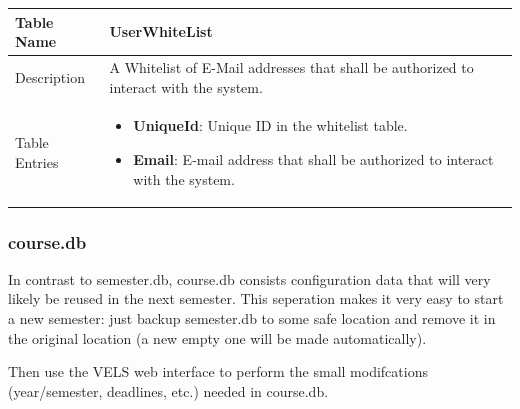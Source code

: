 \begin{tabular}{|p{3cm}|p{10cm}|}
\hline
Table Name & UserWhiteList \\
\hline
Description & A Whitelist of E-Mail addresses that shall be authorized to interact with the system.\\
\hline
Table Entries & \begin{itemize}
        \item {\bf UniqueId}: Unique ID in the whitelist table.
        \item {\bf Email}: E-mail address that shall be authorized to interact with the system.
        \end{itemize} \\
\hline
\end{tabular}

\subsubsection{course.db}

In contrast to semester.db, course.db consists configuration data that will very likely be reused in the next
semester. This seperation makes it very easy to start a new semester: just backup semester.db to some safe
location and remove it in the original location (a new empty one will be made automatically). 

Then use the VELS web interface to perform the small modifcations (year/semester, deadlines, etc.) needed in course.db.

